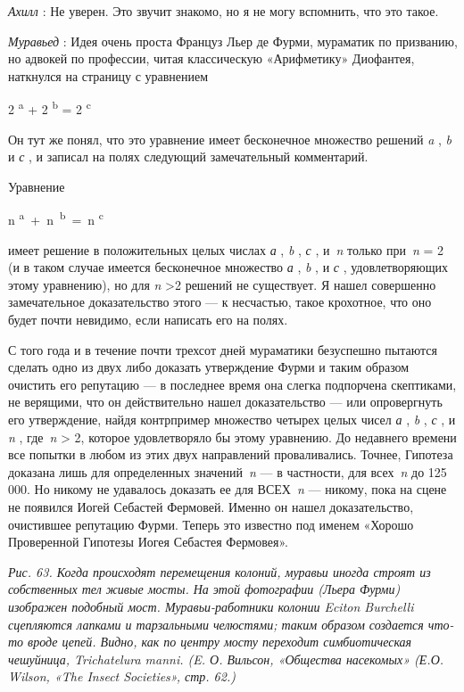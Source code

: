 \documentclass[../main.tex]{subfiles}
\begin{document}
\begin{dialogue}
\emph{Ахилл} : Не уверен. Это звучит знакомо, но я не могу вспомнить, что это такое.

\emph{Муравьед} : Идея очень проста Француз Льер де Фурми, мураматик по призванию, но адвокей по профессии, читая классическую «Арифметику» Диофантея, наткнулся на страницу с уравнением

2 \textsuperscript{a} + 2 \textsuperscript{b} = 2 \textsuperscript{c}

Он тут же понял, что это уравнение имеет бесконечное множество решений \emph{a} , \emph{b} и \emph{с} , и записал на полях следующий замечательный комментарий.

Уравнение

n \textsuperscript{a}~+~n~\textsuperscript{b}~=~n \textsuperscript{c}

имеет решение в положительных целых числах \emph{а} , \emph{b} , \emph{с} , и~\emph{n} только при~\emph{n} = 2 (и в таком случае имеется бесконечное множество \emph{а} , \emph{b} , и \emph{с} , удовлетворяющих этому уравнению), но для \emph{n} \textgreater2 решений не существует. Я нашел совершенно замечательное доказательство этого --- к несчастью, такое крохотное, что оно будет почти невидимо, если написать его на полях.

С того года и в течение почти трехсот дней мураматики безуспешно пытаются сделать одно из двух либо доказать утверждение Фурми и таким образом очистить его репутацию --- в последнее время она слегка подпорчена скептиками, не верящими, что он действительно нашел доказательство --- или опровергнуть его утверждение, найдя контрпример множество четырех целых чисел \emph{а} , \emph{b} , \emph{с} , и \emph{n} , где~\emph{n} \textgreater{} 2, которое удовлетворяло бы этому уравнению. До недавнего времени все попытки в любом из этих двух направлений проваливались. Точнее, Гипотеза доказана лишь для определенных значений~\emph{n} --- в частности, для всех~\emph{n} до 125 000. Но никому не удавалось доказать ее для ВСЕХ~\emph{n} --- никому, пока на сцене не появился Иогей Себастей Фермовей. Именно он нашел доказательство, очистившее репутацию Фурми. Теперь это известно под именем «Хорошо Проверенной Гипотезы Иогея Себастея Фермовея».

\emph{Рис. 63. Когда происходят перемещения колоний, муравьи иногда строят из собственных тел живые мосты. На этой фотографии (Льера Фурми) изображен подобный мост. Муравьи-работники колонии Eciton Burchelli сцепляются лапками и тарзальными челюстями; таким образом создается что-то вроде цепей. Видно, как по центру мосту переходит симбиотическая чешуйница, Trichatelura manni. (E. О. Вильсон, «Общества насекомых» (Е.О. Wilson, «The Insect Societies», стр. 62.)}


\end{dialogue}
\end{document}
